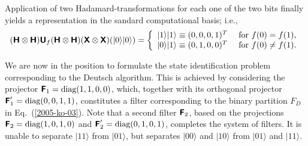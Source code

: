Application of two Hadamard-transformations for each one of the two bits finally yields a
representation in the sandard computational basis; i.e.,
\begin{equation}
(\textsf{\textbf{H}}\otimes\textsf{\textbf{H}})
\textsf{\textbf{U}}_f
(\textsf{\textbf{H}}\otimes\textsf{\textbf{H}})
(\textsf{\textbf{X}}\otimes\textsf{\textbf{X}})
(\vert 0\rangle \vert 0\rangle )
=
\left\{
\begin{array}{ccl}
\vert 1\rangle \vert 1\rangle \equiv (0,0,0,1)^T  &\textrm{ for } f(0)=f(1),\\
\vert 0\rangle \vert 1\rangle \equiv (0,1,0,0)^T   &\textrm{ for } f(0)\neq f(1).\\
\end{array}
\right.
\label{2005-ko-e113}
\end{equation}




We are now in the position to formulate the state identification problem corresponding to the Deutsch
algorithm.
This is achieved
by considering the projector
$\textsf{\textbf{F}}_1 =\textrm{diag}(1,1,0,0)$,
which, together with its orthogonal projector
$\textsf{\textbf{F}}_1' =\textrm{diag}(0,0,1,1)$,
constitutes a filter
corresponding to the binary partition $F_D$ in Eq.~(\ref{2005-ko-03}).
Note that a second filter $\textsf{\textbf{F}}_2$, based on the projections
$\textsf{\textbf{F}}_2 =\textrm{diag}(1,0,1,0)$
and
$\textsf{\textbf{F}}_2' =\textrm{diag}(0,1,0,1)$, completes the system of filters.
It is unable to separate
$\vert 1 1\rangle$
from
$\vert 0 1 \rangle$, but separates
$\vert 0 0 \rangle$
and
$\vert 1 0 \rangle$
from
$\vert 0 1\rangle$
and
$\vert 1 1\rangle$.


